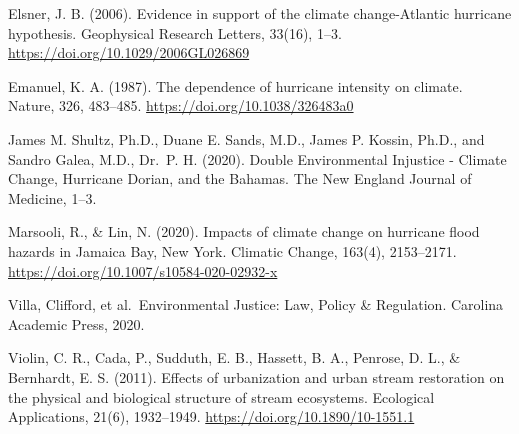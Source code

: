 \documentclass[12pt,]{article}
\begin{document}
Elsner, J. B. (2006). Evidence in support of the climate change-Atlantic
hurricane hypothesis. Geophysical Research Letters, 33(16), 1--3.
\url{https://doi.org/10.1029/2006GL026869}

Emanuel, K. A. (1987). The dependence of hurricane intensity on climate.
Nature, 326, 483--485. \url{https://doi.org/10.1038/326483a0}

James M. Shultz, Ph.D., Duane E. Sands, M.D., James P. Kossin, Ph.D.,
and Sandro Galea, M.D., Dr.~P. H. (2020). Double Environmental Injustice
- Climate Change, Hurricane Dorian, and the Bahamas. The New England
Journal of Medicine, 1--3.

Marsooli, R., \& Lin, N. (2020). Impacts of climate change on hurricane
flood hazards in Jamaica Bay, New York. Climatic Change, 163(4),
2153--2171. \url{https://doi.org/10.1007/s10584-020-02932-x}

Villa, Clifford, et al.~Environmental Justice: Law, Policy \&
Regulation. Carolina Academic Press, 2020.

Violin, C. R., Cada, P., Sudduth, E. B., Hassett, B. A., Penrose, D. L.,
\& Bernhardt, E. S. (2011). Effects of urbanization and urban stream
restoration on the physical and biological structure of stream
ecosystems. Ecological Applications, 21(6), 1932--1949.
\url{https://doi.org/10.1890/10-1551.1}
\end{document}
